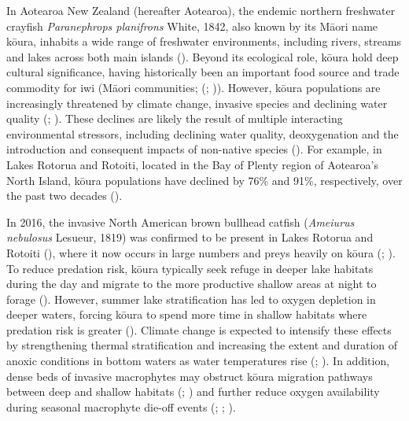 \documentclass[
  letterpaper,
  DIV=11,
  numbers=noendperiod]{scrartcl}
\begin{document}
In Aotearoa New Zealand (hereafter Aotearoa), the endemic northern
freshwater crayfish \emph{Paranephrops planifrons} White, 1842, also
known by its Māori name kōura, inhabits a wide range of freshwater
environments, including rivers, streams and lakes across both main
islands (). Beyond its
ecological role, kōura hold deep cultural significance, having
historically been an important food source and trade commodity for iwi
(Māori communities; (;
)). However, kōura
populations are increasingly threatened by climate change, invasive
species and declining water quality (; ). These
declines are likely the result of multiple interacting environmental
stressors, including declining water quality, deoxygenation and the
introduction and consequent impacts of non-native species
(). For example, in
Lakes Rotorua and Rotoiti, located in the Bay of Plenty region of
Aotearoa's North Island, kōura populations have declined by 76\% and
91\%, respectively, over the past two decades
().

In 2016, the invasive North American brown bullhead catfish
(\emph{Ameiurus nebulosus} Lesueur, 1819) was confirmed to be present in
Lakes Rotorua and Rotoiti (),
where it now occurs in large numbers and preys heavily on kōura
(;
). To reduce predation
risk, kōura typically seek refuge in deeper lake habitats during the day
and migrate to the more productive shallow areas at night to forage
(). However, summer lake
stratification has led to oxygen depletion in deeper waters, forcing
kōura to spend more time in shallow habitats where predation risk is
greater (). Climate change is
expected to intensify these effects by strengthening thermal
stratification and increasing the extent and duration of anoxic
conditions in bottom waters as water temperatures rise
(;
). In addition, dense beds
of invasive macrophytes may obstruct kōura migration pathways between
deep and shallow habitats (; ) and further
reduce oxygen availability during seasonal macrophyte die-off events
(;
;
).
\end{document}
